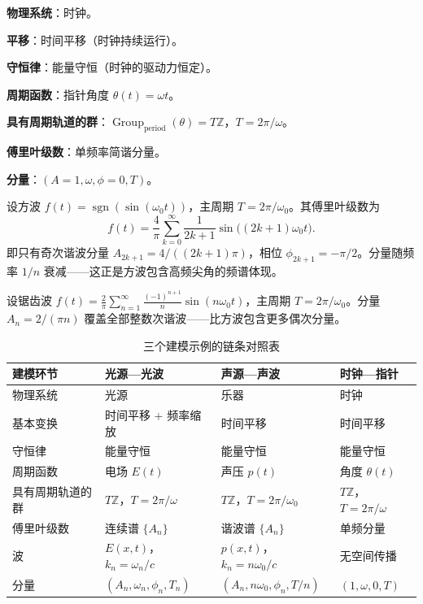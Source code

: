 \begin{example}[时钟—指针—时间]\label{ex:clock_modelling}
\textbf{物理系统}：时钟。

\textbf{平移}：时间平移（时钟持续运行）。

\textbf{守恒律}：能量守恒（时钟的驱动力恒定）。

\textbf{周期函数}：指针角度 $\theta(t) = \omega t$。

\textbf{具有周期轨道的群}：$\operatorname{Group}_{\mathrm{period}}(\theta) = T\mathbb{Z}$，$T = 2\pi/\omega$。

\textbf{傅里叶级数}：单频率简谐分量。

\textbf{分量}：$(A=1, \omega, \phi=0, T)$。
\end{example}

\begin{example}[方波的傅里叶级数]\label{ex:square_wave_fourier}
设方波 $f(t)=\operatorname{sgn}(\sin(\omega_0 t))$，主周期 $T=2\pi/\omega_0$。其傅里叶级数为
\[
f(t) = \frac{4}{\pi}\sum_{k=0}^{\infty} \frac{1}{2k+1}\sin\bigl((2k+1)\omega_0 t\bigr).
\]
即只有奇次谐波分量 $A_{2k+1} = 4/((2k+1)\pi)$，相位 $\phi_{2k+1}=-\pi/2$。分量随频率 $1/n$ 衰减——这正是方波包含高频尖角的频谱体现。
\end{example}

\begin{example}[锯齿波的傅里叶级数]\label{ex:sawtooth_fourier}
设锯齿波 $f(t)=\frac{2}{\pi}\sum_{n=1}^\infty\frac{(-1)^{n+1}}{n}\sin(n\omega_0 t)$，主周期 $T=2\pi/\omega_0$。分量 $A_n = 2/(\pi n)$ 覆盖全部整数次谐波——比方波包含更多偶次分量。
\end{example}

\begin{table}[htbp]
    \centering
    \caption{三个建模示例的链条对照表}
    \label{tab:modelling_examples}
    \small
    \renewcommand{\arraystretch}{1.25}
    \begin{tabular}{@{}p{2.0cm} p{3.6cm} p{3.6cm} p{3.6cm}@{}}
    \toprule
    建模环节 & 光源—光波 & 声源—声波 & 时钟—指针 \\
    \midrule
    物理系统 & 光源 & 乐器 & 时钟 \\
    基本变换 & 时间平移 + 频率缩放 & 时间平移 & 时间平移 \\
    守恒律 & 能量守恒 & 能量守恒 & 能量守恒 \\
    周期函数 & 电场 $E(t)$ & 声压 $p(t)$ & 角度 $\theta(t)$ \\
    具有周期轨道的群 & $T\mathbb{Z}$，$T=2\pi/\omega$ & $T\mathbb{Z}$，$T=2\pi/\omega_0$ & $T\mathbb{Z}$，$T=2\pi/\omega$ \\
    傅里叶级数 & 连续谱 $\{A_n\}$ & 谐波谱 $\{A_n\}$ & 单频分量 \\
    波 & $E(x,t)$，$k_n=\omega_n/c$ & $p(x,t)$，$k_n=n\omega_0/c$ & 无空间传播 \\
    分量 & $(A_n,\omega_n,\phi_n,T_n)$ & $(A_n,n\omega_0,\phi_n,T/n)$ & $(1,\omega,0,T)$ \\
    \bottomrule
    \end{tabular}
\end{table}

